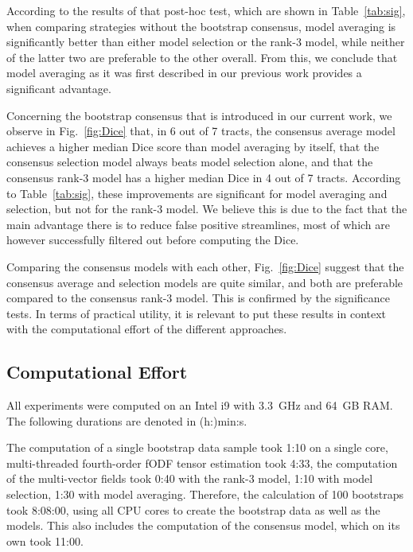 According to the results of that post-hoc test, which are shown in Table~\ref{tab:sig}, when comparing strategies without the bootstrap consensus,
model averaging is significantly better than either model selection or the rank-3 model, while neither of the latter two are preferable to the other overall. From this, we conclude that model averaging as it was first described in our previous work \cite{Gruen:2021} provides a significant advantage.

Concerning the bootstrap consensus that is introduced in our current work, we observe in Fig.~\ref{fig:Dice} that, in 6 out of 7 tracts, the consensus average model achieves a higher median Dice score than model averaging by itself, that the consensus selection model always beats model selection alone, and that the consensus rank-3 model has a higher median Dice in 4 out of 7
tracts. According to Table~\ref{tab:sig}, these improvements are significant for model averaging and selection, but not for the rank-3 model. We believe this is due to the fact that the main advantage there is to reduce false positive streamlines, most of which are however successfully filtered out before computing the Dice.

Comparing the consensus models with each other, Fig.~\ref{fig:Dice} suggest that the consensus average and selection models are quite similar, and both are
preferable compared to the consensus rank-3 model. This is confirmed by the significance tests. In terms of practical utility, it is relevant to put these results in context with the computational effort of the different approaches.

\subsection{Computational Effort}
All experiments were computed on an Intel i9 with 3.3~GHz and 64~GB RAM. The
following durations are denoted in (h:)min:s.

The computation of a single bootstrap data sample took 1:10 on a single core,
multi-threaded fourth-order fODF tensor estimation took 4:33, the computation of the multi-vector fields took 0:40 with the rank-3 model, 1:10 with model selection, 1:30 with model averaging. Therefore, the calculation of 100 bootstraps took 8:08:00, using all CPU cores to create the bootstrap data as well as the
models. This also includes the computation of the consensus model, which on its
own took 11:00.

